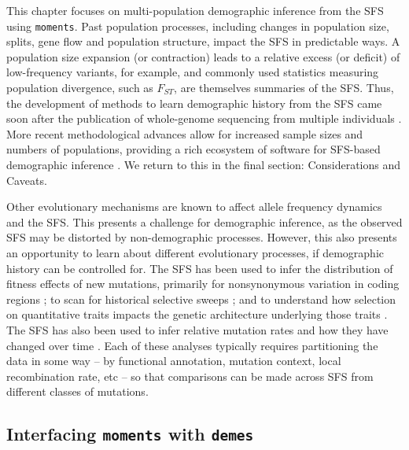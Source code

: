 \documentclass[]{article}
\newcommand{\moments}{\texttt{moments}\xspace}
\newcommand{\demes}{\texttt{demes}\xspace}
\begin{document}
This chapter focuses on multi-population demographic inference from the SFS
using \moments \citep{jouganous2017inferring}.  Past population processes,
including changes in population size, splits, gene flow and population
structure, impact the SFS in predictable ways. A population size expansion (or
contraction) leads to a relative excess (or deficit) of low-frequency variants,
for example, and commonly used statistics measuring population divergence, such
as $F_{ST}$, are themselves summaries of the SFS.  Thus, the development of
methods to learn demographic history from the SFS came soon after the
publication of whole-genome sequencing from multiple individuals
\citep{marth2004allele, williamson2005simultaneous}. More recent methodological
advances allow for increased sample sizes and numbers of populations, providing
a rich ecosystem of software for SFS-based demographic inference
\citep{gutenkunst2009inferring, excoffier2011fastsimcoal,
gravel2011demographic, jouganous2017inferring, ragsdale2018genomic,
kamm2020efficiently, dilber2024faster}. We return to this in the final section:
Considerations and Caveats.

Other evolutionary mechanisms are known to affect allele frequency dynamics and
the SFS. This presents a challenge for demographic inference, as the observed
SFS may be distorted by non-demographic processes. However, this also presents
an opportunity to learn about different evolutionary processes, if demographic
history can be controlled for. The SFS has been used to infer the distribution
of fitness effects of new mutations, primarily for nonsynonymous variation in
coding regions \citep[e.g.,][]{eyre2006distribution, boyko2008assessing,
kim2017inference}; to scan for historical selective sweeps
\citep[e.g.,][]{kim2002detecting, nielsen2005genomic}; and to understand how
selection on quantitative traits impacts the genetic architecture underlying
those traits \citep[eg.,][]{patel2024conditional, ragsdale2024archaic}. The SFS
has also been used to infer relative mutation rates and how they have changed
over time \citep{dewitt2021nonparametric}. Each of these analyses typically
requires partitioning the data in some way -- by functional annotation,
mutation context, local recombination rate, etc -- so that comparisons can be
made across SFS from different classes of mutations.

\subsection*{Interfacing \moments with \demes}
\end{document}
